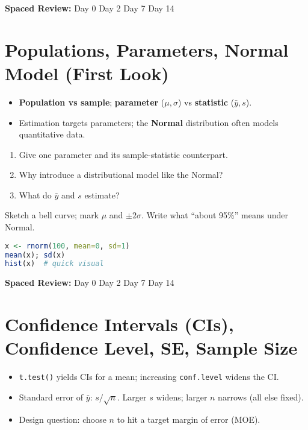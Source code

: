 \documentclass[11pt,a4paper]{article}
\newcommand{\reviewticks}{
  \vspace{0.4em}
  \noindent\scriptsize\textbf{Spaced Review:}
  \fbox{\phantom{D0}} Day 0\quad
  \fbox{\phantom{D2}} Day 2\quad
  \fbox{\phantom{D7}} Day 7\quad
  \fbox{\phantom{D14}} Day 14
}
\begin{document}
\reviewticks

\section{Populations, Parameters, Normal Model (First Look)}

\begin{corebox}
\begin{itemize}
  \item \textbf{Population vs sample}; \textbf{parameter} (\(\mu,\sigma\)) vs \textbf{statistic} (\(\bar{y}, s\)).
  \item Estimation targets parameters; the \textbf{Normal} distribution often models quantitative data.
\end{itemize}
\end{corebox}

\begin{recallbox}
\begin{enumerate}
  \item Give one parameter and its sample-statistic counterpart.
  \item Why introduce a distributional model like the Normal?
  \item What do \(\bar{y}\) and \(s\) estimate?
\end{enumerate}
\end{recallbox}

\begin{practicebox}
Sketch a bell curve; mark \(\mu\) and \(\pm 2\sigma\). Write what ``about 95\%'' means under Normal.
\end{practicebox}

\begin{rbox}
\begin{lstlisting}[language=R]
x <- rnorm(100, mean=0, sd=1)
mean(x); sd(x)
hist(x)  # quick visual
\end{lstlisting}
\end{rbox}

\reviewticks

\section{Confidence Intervals (CIs), Confidence Level, SE, Sample Size}

\begin{corebox}
\begin{itemize}
  \item \texttt{t.test()} yields CIs for a mean; increasing \texttt{conf.level} widens the CI.
  \item Standard error of \(\bar{y}\): \( s/\sqrt{n} \). Larger \(s\) widens; larger \(n\) narrows (all else fixed).
  \item Design question: choose \(n\) to hit a target margin of error (MOE).
\end{itemize}
\end{corebox}
\end{document}
